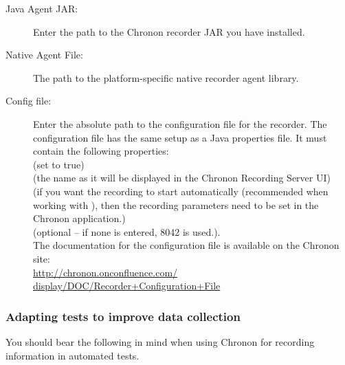 \begin{description}
\item [Java Agent JAR:]{Enter the path to the Chronon recorder JAR you have installed.}
\item [Native Agent File:]{The path to the platform-specific native recorder agent library.}
\item [Config file:]{Enter the absolute path to the configuration file for the recorder. The configuration file has the same setup as a Java properties file. It must contain the following properties:\\
 (set to true)\\
 (the \gdaut{} name as it will be displayed in the Chronon Recording Server UI)\\
 (if you want the recording to start automatically (recommended when working with \app{}), then the recording parameters need to be set in the Chronon application.)\\ 
 (optional -- if none is entered, 8042 is used.). \\
The documentation for the configuration file is available on the Chronon site:\\
\href{http://chronon.onconfluence.com/\\
display/DOC/Recorder+Configuration+File}{http://chronon.onconfluence.com/\\
display/DOC/Recorder+Configuration+File}}
\end{description}


\subsubsection{Adapting tests to improve data collection}
You should bear the following in mind when using Chronon for recording information in automated tests.\\

